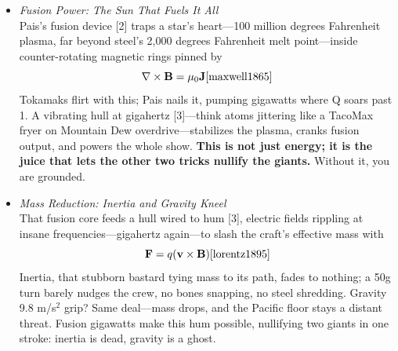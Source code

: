 \documentclass[11pt]{article}
\begin{document}
	\begin{itemize}
		\item \textit{Fusion Power: The Sun That Fuels It All} \\
		Pais’s fusion device [2] traps a star’s heart—100 million degrees Fahrenheit plasma, far beyond steel’s 2,000 degrees Fahrenheit melt point—inside counter-rotating magnetic rings pinned by
		\begin{equation}
			\nabla \times \mathbf{B} = \mu_0 \mathbf{J} \cite{maxwell1865}
		\end{equation}
		Tokamaks flirt with this; Pais nails it, pumping gigawatts where Q soars past 1. A vibrating hull at gigahertz [3]—think atoms jittering like a TacoMax fryer on Mountain Dew overdrive—stabilizes the plasma, cranks fusion output, and powers the whole show. \textbf{This is not just energy; it is the juice that lets the other two tricks nullify the giants.} Without it, you are grounded.
		
		\item \textit{Mass Reduction: Inertia and Gravity Kneel} \\
		That fusion core feeds a hull wired to hum [3], electric fields rippling at insane frequencies—gigahertz again—to slash the craft’s effective mass with
		\begin{equation}
			\mathbf{F} = q(\mathbf{v} \times \mathbf{B}) \cite{lorentz1895}
		\end{equation}
		Inertia, that stubborn bastard tying mass to its path, fades to nothing; a 50g turn barely nudges the crew, no bones snapping, no steel shredding. Gravity 9.8 m/s$^2$ grip? Same deal—mass drops, and the Pacific floor stays a distant threat. Fusion gigawatts make this hum possible, nullifying two giants in one stroke: inertia is dead, gravity is a ghost.
		

\end{itemize}
\end{document}

